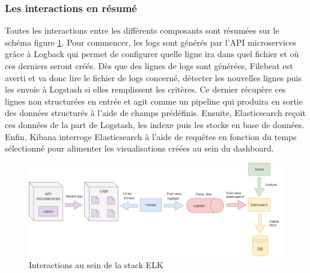	\subsubsection{Les interactions en résumé}
	Toutes les interactions entre les différents composants sont résumées sur le schéma figure \ref{elk}. Pour commencer, les logs sont générés par l'API microservices grâce à Logback qui permet de configurer quelle ligne ira dans quel fichier et où ces derniers seront créés. Dès que des lignes de logs sont générées, Filebeat est averti et va donc lire le fichier de logs concerné, détecter les nouvelles lignes puis les envoie à Logstash si elles remplissent les critères. Ce dernier récupère ces lignes non structurées en entrée et agit comme un pipeline qui produira en sortie des données structurés à l'aide de champs prédéfinis. Ensuite, Elasticsearch reçoit ces données de la part de Logstash, les indexe puis les stocke en base de données. Enfin, Kibana interroge Elasticsearch à l'aide de requêtes en fonction du temps sélectionné pour alimenter les visualisations créées au sein du dashboard. 
	
\begin{figure}[h!]
	\includegraphics[scale=0.5]{images/travailNeuflizeOBC/dashboard/elk.png}
	\centering
	\caption{Interactions au sein de la stack ELK}
	\label{elk}
\end{figure}